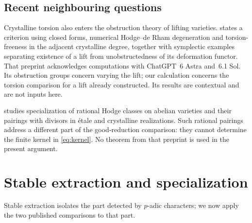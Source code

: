 \documentclass[11pt]{article}
\theoremstyle{definition}\newtheorem{definition}[theorem]{Definition}
\theoremstyle{remark}\newtheorem{remark}[theorem]{Remark}
\begin{document}
\subsection*{Recent neighbouring questions}

Crystalline torsion also enters the obstruction theory of lifting varieties. \citet[Theorem~A and \S1.4]{Zou} states a criterion using closed forms, numerical Hodge--de Rham degeneration and torsion-freeness in the adjacent crystalline degree, together with symplectic examples separating existence of a lift from unobstructedness of its deformation functor. That preprint acknowledges computations with ChatGPT~6 Astra and~6.1 Sol. Its obstruction groups concern varying the lift; our calculation concerns the torsion comparison for a lift already constructed. Its results are contextual and are not inputs here.

\citet[Theorem~1.1 and \S1.2, pp.~1--3]{OpenAI} studies specialization of rational Hodge classes on abelian varieties and their pairings with divisors in \'etale and crystalline realizations. Such rational pairings address a different part of the good-reduction comparison: they cannot determine the finite kernel in \eqref{eq:kernel}. No theorem from that preprint is used in the present argument.

\section{Stable extraction and specialization}

Stable extraction isolates the part detected by $p$-adic characters; we now apply the two published comparisons to that part.
\end{document}
